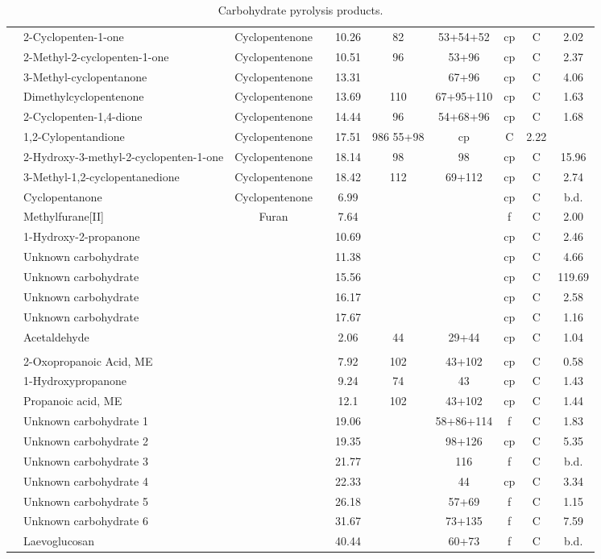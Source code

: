 \documentclass[preprint,review,12pt]{elsarticle}
\begin{document}
\begin{table*}[h!]
\begin{center}
{\begin{tabular}{llclcccccc}
\\
&		2-Cyclopenten-1-one&		Cyclopentenone&		&		10.26&		82&	53+54+52&	cp&	C&	2.02\\
&		2-Methyl-2-cyclopenten-1-one&	Cyclopentenone&		&		10.51&		96&	53+96&		cp&	C&	2.37\\
&		3-Methyl-cyclopentanone&	Cyclopentenone&		&		13.31&		&	67+96&		cp&	C&	4.06\\
&		Dimethylcyclopentenone&		Cyclopentenone&		&		13.69&		110&	67+95+110&	cp&	C&	1.63\\
&		2-Cyclopenten-1,4-dione&	Cyclopentenone&		&		14.44&		96&	54+68+96&	cp&	C&	1.68\\
&		1,2-Cylopentandione&		Cyclopentenone&		&		17.51&		986	55+98&		cp&	C&	2.22\\
&		2-Hydroxy-3-methyl-2-cyclopenten-1-one&	Cyclopentenone&	&		18.14&		98&	98&		cp&	C&	15.96\\
&		3-Methyl-1,2-cyclopentanedione&	Cyclopentenone&		&		18.42&		112&	69+112&		cp&	C&	2.74\\
&		Cyclopentanone&			Cyclopentenone&		&		6.99&		&	&		cp&	C&	b.d.\\
&		Methylfurane[II]&		Furan&			&		7.64&		&	&		f&	C&	2.00\\
&		1-Hydroxy-2-propanone&		&			&		10.69&		&	&		cp&	C&	2.46\\
&		Unknown carbohydrate&		&			&		11.38&		&	&		cp&	C&	4.66\\
&		Unknown carbohydrate&		&			&		15.56&		&	&		cp&	C&	119.69\\
&		Unknown carbohydrate&		&			&		16.17&		&	&		cp&	C&	2.58\\
&		Unknown carbohydrate&		&			&		17.67&		&	&		cp&	C&	1.16\\
&		Acetaldehyde&			&			&		2.06&		44&	29+44&		cp&	C&	1.04\\
\\
&		2-Oxopropanoic Acid, ME&	&			&		7.92&		102&	43+102&		cp&	C&	0.58\\
&		1-Hydroxypropanone&		&			&		9.24&		74&	43&		cp&	C&	1.43\\
&		Propanoic acid, ME&		&			&		12.1&		102&	43+102&		cp&	C&	1.44\\
&		Unknown carbohydrate 1&		&			&		19.06&		&	58+86+114&	f&	C&	1.83\\
&		Unknown carbohydrate 2&		&			&		19.35&		&	98+126&		cp&	C&	5.35\\
&		Unknown carbohydrate 3&		&			&		21.77&		&	116&		f&	C&	b.d.\\
&		Unknown carbohydrate 4&		&			&		22.33&		&	44&		cp&	C&	3.34\\
&		Unknown carbohydrate 5&		&			&		26.18&		&	57+69&		f&	C&	1.15\\
&		Unknown carbohydrate 6&		&			&		31.67&		&	73+135&		f&	C&	7.59\\
&		Laevoglucosan&			&			&		40.44&		&	60+73&		f&	C&	b.d.\\

\hline
\end{tabular}}
\caption{Carbohydrate pyrolysis products.}
\end{center}
\label{tab:chprod}
\end{table*}
\end{document}
